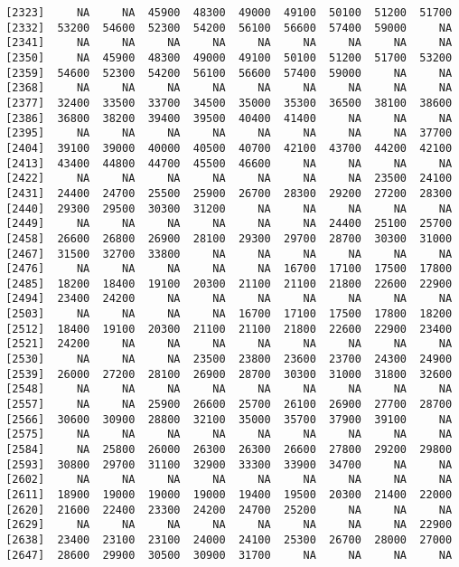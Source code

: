 \documentclass[]{article}
\begin{document}
\begin{verbatim}
 [2323]     NA     NA  45900  48300  49000  49100  50100  51200  51700
 [2332]  53200  54600  52300  54200  56100  56600  57400  59000     NA
 [2341]     NA     NA     NA     NA     NA     NA     NA     NA     NA
 [2350]     NA  45900  48300  49000  49100  50100  51200  51700  53200
 [2359]  54600  52300  54200  56100  56600  57400  59000     NA     NA
 [2368]     NA     NA     NA     NA     NA     NA     NA     NA     NA
 [2377]  32400  33500  33700  34500  35000  35300  36500  38100  38600
 [2386]  36800  38200  39400  39500  40400  41400     NA     NA     NA
 [2395]     NA     NA     NA     NA     NA     NA     NA     NA  37700
 [2404]  39100  39000  40000  40500  40700  42100  43700  44200  42100
 [2413]  43400  44800  44700  45500  46600     NA     NA     NA     NA
 [2422]     NA     NA     NA     NA     NA     NA     NA  23500  24100
 [2431]  24400  24700  25500  25900  26700  28300  29200  27200  28300
 [2440]  29300  29500  30300  31200     NA     NA     NA     NA     NA
 [2449]     NA     NA     NA     NA     NA     NA  24400  25100  25700
 [2458]  26600  26800  26900  28100  29300  29700  28700  30300  31000
 [2467]  31500  32700  33800     NA     NA     NA     NA     NA     NA
 [2476]     NA     NA     NA     NA     NA  16700  17100  17500  17800
 [2485]  18200  18400  19100  20300  21100  21100  21800  22600  22900
 [2494]  23400  24200     NA     NA     NA     NA     NA     NA     NA
 [2503]     NA     NA     NA     NA  16700  17100  17500  17800  18200
 [2512]  18400  19100  20300  21100  21100  21800  22600  22900  23400
 [2521]  24200     NA     NA     NA     NA     NA     NA     NA     NA
 [2530]     NA     NA     NA  23500  23800  23600  23700  24300  24900
 [2539]  26000  27200  28100  26900  28700  30300  31000  31800  32600
 [2548]     NA     NA     NA     NA     NA     NA     NA     NA     NA
 [2557]     NA     NA  25900  26600  25700  26100  26900  27700  28700
 [2566]  30600  30900  28800  32100  35000  35700  37900  39100     NA
 [2575]     NA     NA     NA     NA     NA     NA     NA     NA     NA
 [2584]     NA  25800  26000  26300  26300  26600  27800  29200  29800
 [2593]  30800  29700  31100  32900  33300  33900  34700     NA     NA
 [2602]     NA     NA     NA     NA     NA     NA     NA     NA     NA
 [2611]  18900  19000  19000  19000  19400  19500  20300  21400  22000
 [2620]  21600  22400  23300  24200  24700  25200     NA     NA     NA
 [2629]     NA     NA     NA     NA     NA     NA     NA     NA  22900
 [2638]  23400  23100  23100  24000  24100  25300  26700  28000  27000
 [2647]  28600  29900  30500  30900  31700     NA     NA     NA     NA

\end{verbatim}
\end{document}
